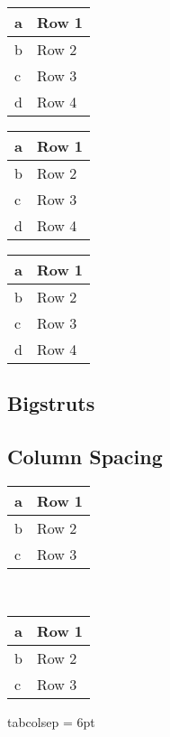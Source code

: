 \documentclass[12pt,a4paper]{report}
\begin{document}
	
		{
		\setlength{\extrarowheight}{1.0pt}
		\begin{tabular}{|l|l|}
		\hline
		a & Row 1 \\ \hline
		b & Row 2 \\ \hline
		c & Row 3 \\ \hline
		d & Row 4 \\ \hline
		\end{tabular}
		}
		{
		\setlength{\extrarowheight}{1.5pt}
		\begin{tabular}{|l|l|}
		\hline
		a & Row 1 \\ \hline
		b & Row 2 \\ \hline
		c & Row 3 \\ \hline
		d & Row 4 \\ \hline
		\end{tabular}
		}
		{
		\setlength{\extrarowheight}{2.0pt}
		\begin{tabular}{|l|l|}
		\hline
		a & Row 1 \\ \hline
		b & Row 2 \\ \hline
		c & Row 3 \\ \hline
		d & Row 4 \\ \hline
		\end{tabular}
		}


	\clearpage %
	\subsection{Bigstruts}
	
	
	
	
	\clearpage
	\subsection{Column Spacing}
	

			\begin{tabular}{|l|l|}
			\hline
			a & Row 1 \\ \hline
			b & Row 2 \\ \hline
			c & Row 3 \\ \hline
			\end{tabular}\\

			\setlength{\tabcolsep}{6pt}
			\begin{tabular}{|l|l|}
			\hline
			a & Row 1 \\ \hline
			b & Row 2 \\ \hline
			c & Row 3 \\ \hline
			\end{tabular}			tabcolsep = 6pt
		
\end{document}

